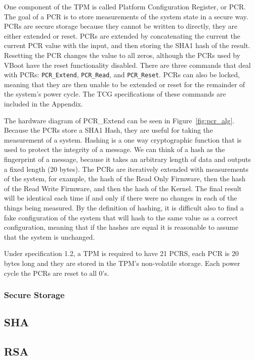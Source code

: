\documentclass[../report.tex]{subfiles}
\def\code#1{\texttt{#1}}
\begin{document}
One component of the TPM is called Platform Configuration Register, or PCR.
The goal of a PCR is to store measurements of the system state in a secure way. 
PCRs are secure storage because they cannot be written to directly, they are either extended or reset. 
PCRs are extended by concatenating the current the current PCR value with the input, and then storing the SHA1 hash of the result. 
Resetting the PCR changes the value to all zeros, although the PCRs used by VBoot have the reset functionality disabled.
There are three commands that deal with PCRs: \code{PCR\_Extend},
\code{PCR\_Read}, and \code{PCR\_Reset}.
PCRs can also be locked, meaning that they are then unable to be extended or reset for the remainder of the system's power cycle.
The TCG specifications of these commands are included in the Appendix.


The hardware diagram of PCR\_Extend can be seen in Figure~\ref{fig:pcr_alg}.
Because the PCRs store a SHA1 Hash, they are useful for taking the measurement of a system.  
Hashing is a one way cryptographic function that is used to protect the integrity of a message.
We can think of a hash as the fingerprint of a message, because it takes an arbitrary length of data and outputs a fixed length (20 bytes).
The PCRs are iteratively extended with measurements of the system, for example, the hash of the Read Only Firmware, then the hash of the Read Write Firmware, and then the hash of the Kernel.
The final result will be identical each time if and only if there were no changes in each of the things being measured.
By the definition of hashing, it is difficult also to find a fake configuration of the system that will hash to the same value as a correct configuration, meaning that if the hashes are equal it is reasonable to assume that the system is unchanged. 

Under specification 1.2, a TPM is required to have 21 PCRS, each PCR is 20 bytes
long and they are stored in the TPM's non-volatile storage.
Each power cycle the PCRs are reset to all 0's.

\subsubsection{Secure Storage}


\subsection{SHA}
\subsection{RSA}
\end{document}
